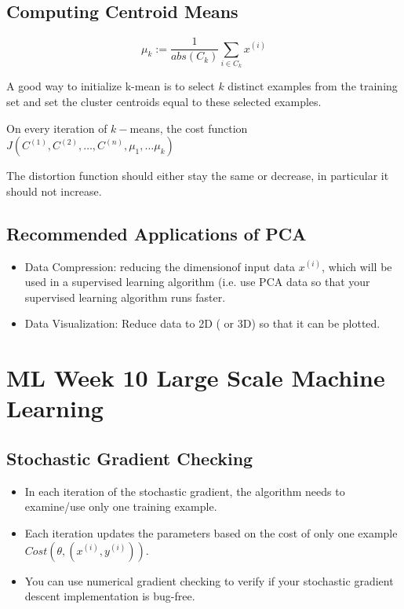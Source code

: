 \subsection{Computing Centroid Means}

\[ 
\mu_k := \frac{1}{abs(C_k)} \sum_{i \in C_k} x^{(i)}
\]

A good way to initialize k-mean is to select $k$ distinct examples from the training set and set the cluster centroids equal to these selected examples.

On every iteration of $k-$means, the cost function $J(C^{(1)},C^{(2)},\ldots, C^{(n)},
\mu_1,\ldots \mu_k)$

The distortion function should either stay the same or decrease, in particular it should not increase.

\subsection{Recommended Applications of PCA}

\begin{itemize}
\item Data Compression: reducing the dimensionof input data $x^{(i)}$, which will be used in a supervised learning algorithm
(i.e. use PCA data so that your supervised learning algorithm runs faster.

\item Data Visualization: Reduce data to 2D ( or 3D) so that it can be plotted.
\end{itemize}


\section*{ML Week 10 Large Scale Machine Learning}

\subsection*{Stochastic Gradient Checking}

\begin{itemize}
\item In each iteration of the stochastic gradient, the algorithm needs to examine/use only one training example.
\item Each iteration updates the parameters based on the cost of only one example $ Cost (\theta,(x^{(i)},y^{(i)}))$.
\item You can use numerical gradient checking to verify if your stochastic gradient descent implementation is bug-free.
\end{itemize}
